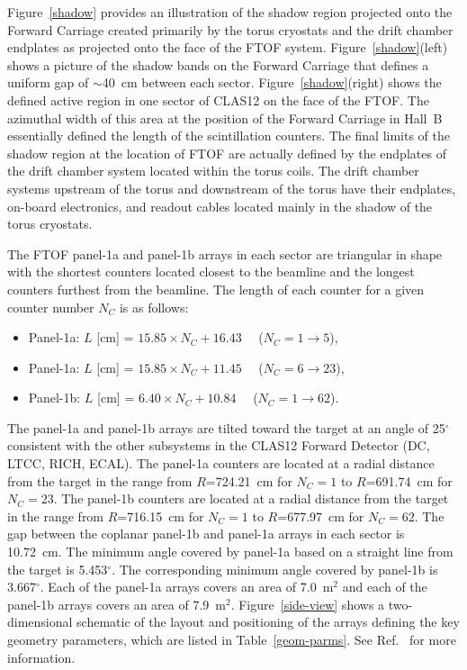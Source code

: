 \documentclass[final,3p,twocolumn]{elsarticle}
\begin{document}
Figure~\ref{shadow} provides an illustration of the shadow region projected onto the Forward Carriage
created primarily by the torus cryostats and the drift chamber endplates as projected onto the face of
the FTOF system. Figure~\ref{shadow}(left) shows a picture of the shadow bands on the Forward
Carriage that defines a uniform gap of $\sim$40~cm between each sector. Figure~\ref{shadow}(right)
shows the defined active region in one sector of CLAS12 on the face of the FTOF. The azimuthal width
of this area at the position of the Forward Carriage in Hall~B essentially defined the length of the
scintillation counters. The final limits of the shadow region at the location of FTOF are actually defined
by the endplates of the drift chamber system located within the torus coils. The drift chamber systems
upstream of the torus and downstream of the torus have their endplates, on-board electronics, and readout
cables located mainly in the shadow of the torus cryostats.

The FTOF panel-1a and panel-1b arrays in each sector are triangular in shape with the shortest counters
located closest to the beamline and the longest counters furthest from the beamline. The length of each
counter for a given counter number $N_C$ is as follows:

\begin{itemize}
\item Panel-1a: $L$ [cm] = $15.85 \times N_C + 16.43$ ~~($N_C = 1 \to 5$), 
\item Panel-1a: $L$ [cm] = $15.85 \times N_C + 11.45$ ~~($N_C = 6 \to 23$), 
\item Panel-1b: $L$ [cm] = $6.40 \times N_C + 10.84$ ~~($N_C = 1 \to 62$).
\end{itemize}

The panel-1a and panel-1b arrays are tilted toward the target at an angle of 25$^{\circ}$ consistent with
the other subsystems in the CLAS12 Forward Detector (DC, LTCC, RICH, ECAL). The panel-1a counters
are located at a radial distance from the target in the range from $R$=724.21~cm for $N_C = 1$ to
$R$=691.74~cm for $N_C = 23$. The panel-1b counters are located at a radial distance from the target
in the range from $R$=716.15~cm for $N_C = 1$ to $R$=677.97~cm for $N_C = 62$. The gap between the
coplanar panel-1b and panel-1a arrays in each sector is 10.72~cm. The minimum angle covered by panel-1a
based on a straight line from the target is 5.453$^\circ$. The corresponding minimum angle covered by
panel-1b is 3.667$^\circ$. Each of the panel-1a arrays covers an area of 7.0~m$^2$ and each of the
panel-1b arrays covers an area of 7.9~m$^2$. Figure~\ref{side-view} shows a two-dimensional schematic
of the layout and positioning of the arrays defining the key geometry parameters, which are listed in
Table~\ref{geom-parms}. See Ref.~\cite{ftof-geom} for more information.
\end{document}
